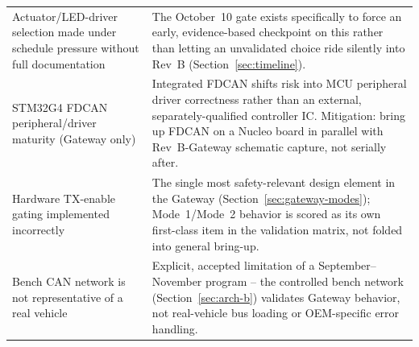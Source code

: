 \begin{center}
\begin{tabularx}{\linewidth}{@{}p{3.6cm} X@{}}
Actuator/LED-driver selection made under schedule pressure without full documentation & The October~10 gate exists specifically to force an early, evidence-based checkpoint on this rather than letting an unvalidated choice ride silently into Rev~B (Section~\ref{sec:timeline}). \\
STM32G4 FDCAN peripheral/driver maturity (Gateway only) & Integrated FDCAN shifts risk into MCU peripheral driver correctness rather than an external, separately-qualified controller IC. Mitigation: bring up FDCAN on a Nucleo board in parallel with Rev~B-Gateway schematic capture, not serially after. \\
Hardware TX-enable gating implemented incorrectly & The single most safety-relevant design element in the Gateway (Section~\ref{sec:gateway-modes}); Mode~1/Mode~2 behavior is scored as its own first-class item in the validation matrix, not folded into general bring-up. \\
Bench CAN network is not representative of a real vehicle & Explicit, accepted limitation of a September--November program -- the controlled bench network (Section~\ref{sec:arch-b}) validates Gateway behavior, not real-vehicle bus loading or OEM-specific error handling. \\
\bottomrule
\end{tabularx}
\end{center}
